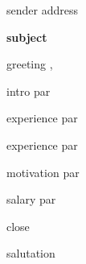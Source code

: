 \documentclass[12pt, a4paper]{article}
\newcommand{\senderaddress}{%
    sender address%
}
\begin{document}
	\begin{flushright}
		{%
		\footnotesize%
		\senderaddress%
		\\%
		}
	\end{flushright}

	\vspace{\baselineskip}


    \textbf{%
        subject%
    }

	\vspace{2\baselineskip}

	    greeting%
	,

	\vspace{\baselineskip}

        intro par%

	\vspace{2\baselineskip}

        experience par%

    \vspace{\baselineskip}

        experience par%

    \vspace{\baselineskip}

	\vspace{\baselineskip}

        motivation par%

    \vspace{\baselineskip}

    \vspace{\baselineskip}

	    salary par%

	    \vspace{2\baselineskip}

        close%

	\vspace{\baselineskip}
	
	    salutation%

\end{document}
